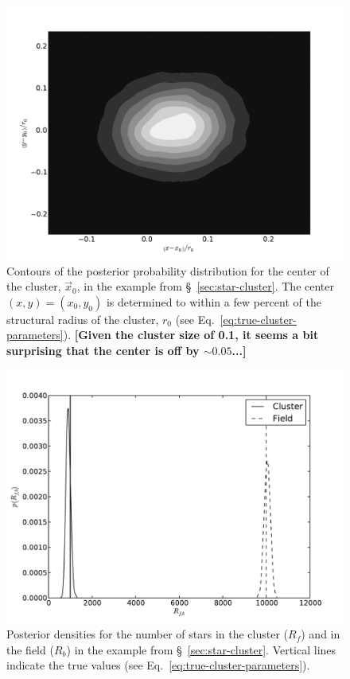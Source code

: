 \documentclass[aps,prd]{revtex4-1}
\newcommand{\ilya}[1]{{\color{red} \bf #1}}
\begin{document}
\begin{figure}
  \includegraphics[width=\columnwidth]{sky_location}
  \caption{\label{fig:sky-loc} Contours of the posterior probability
    distribution for the center of the cluster, $\vec{x}_0$, in the
    example from \S~\ref{sec:star-cluster}.  The center $(x,y) =
    \left(x_0, y_0\right)$ is determined to within a few percent of
    the structural radius of the cluster, $r_0$ (see
    Eq.~\eqref{eq:true-cluster-parameters}). \ilya{[Given the cluster
        size of 0.1, it seems a bit surprising that the center is off
        by $\sim 0.05$...]}}
\end{figure}

\begin{figure}
  \includegraphics[width=\columnwidth]{numbers}
  \caption{\label{fig:cluster-number} Posterior densities for the
    number of stars in the cluster ($R_f$) and in the field ($R_b$) in
    the example from \S~\ref{sec:star-cluster}.  Vertical lines
    indicate the true values (see
    Eq.~\eqref{eq:true-cluster-parameters}). }
\end{figure}
\end{document}
